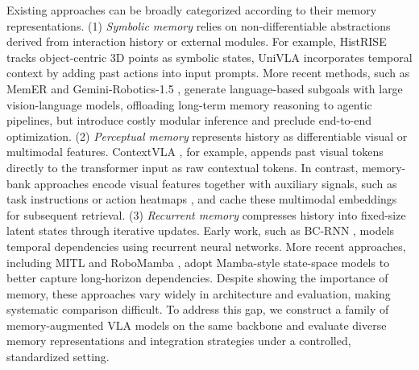 Existing approaches can be broadly categorized according to their memory representations.
(1) \textit{Symbolic memory} relies on non-differentiable abstractions derived from interaction history or external modules. For example, HistRISE \cite{chen2025history} tracks object-centric 3D points as symbolic states,
UniVLA \cite{bu2025learning} incorporates temporal context by
adding past actions into input prompts.
More recent methods, such as MemER \cite{sridhar2025memer} and Gemini-Robotics-1.5 \cite{team2025geminirobot}, generate language-based subgoals with large vision-language models, offloading long-term memory reasoning to agentic pipelines, but introduce costly modular inference and preclude end-to-end optimization.
(2) \textit{Perceptual memory} represents history as differentiable visual or multimodal features. ContextVLA \cite{jang2025contextvla}, for example, appends past visual tokens directly to the transformer input as raw contextual tokens. In contrast, memory-bank approaches encode visual features together with auxiliary signals, such as task instructions \cite{shi2025memoryvla, koo2025hamlet} or action heatmaps \cite{fang2025sam2act}, and cache these multimodal embeddings for subsequent retrieval.
(3) \textit{Recurrent memory} compresses history into fixed-size latent states through iterative updates. Early work, such as BC-RNN \cite{mandlekar2021matters}, models temporal dependencies using recurrent neural networks. More recent approaches, including MITL \cite{zhou2025mtil} and RoboMamba \cite{liu2024robomamba}, adopt Mamba-style state-space models \cite{gu2024mamba} to better capture long-horizon dependencies.
Despite showing the importance of memory, these approaches vary widely in architecture and evaluation, making systematic comparison difficult. To address this gap, we construct a family of memory-augmented VLA models on the same backbone and evaluate diverse memory representations and integration strategies under a controlled, standardized setting.
